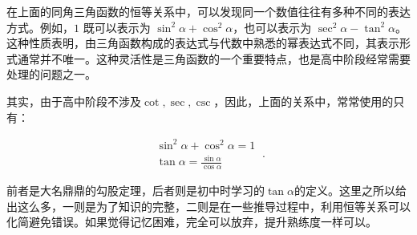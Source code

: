 在上面的同角三角函数的恒等关系中，可以发现同一个数值往往有多种不同的表达方式。例如，$1$ 既可以表示为 $\sin^2\alpha+\cos^2\alpha$，也可以表示为 $\sec^2\alpha-\tan^2\alpha$。这种性质表明，由三角函数构成的表达式与代数中熟悉的幂表达式不同，其表示形式通常并不唯一。这种灵活性是三角函数的一个重要特点，也是高中阶段经常需要处理的问题之一。

其实，由于高中阶段不涉及$\cot,\sec,\csc$，因此，上面的关系中，常常使用的只有：

\begin{equation}
\begin{array}{c} 
\sin ^{2} \alpha + \cos ^{2}\alpha=1\\
\displaystyle\tan \alpha= \frac{\sin \alpha}{\cos \alpha}
\end{array}~.
\end{equation}

前者是大名鼎鼎的勾股定理，后者则是初中时学习的$\tan\alpha$的定义。这里之所以给出这么多，一则是为了知识的完整，二则是在一些推导过程中，利用恒等关系可以化简避免错误。如果觉得记忆困难，完全可以放弃，提升熟练度一样可以。

